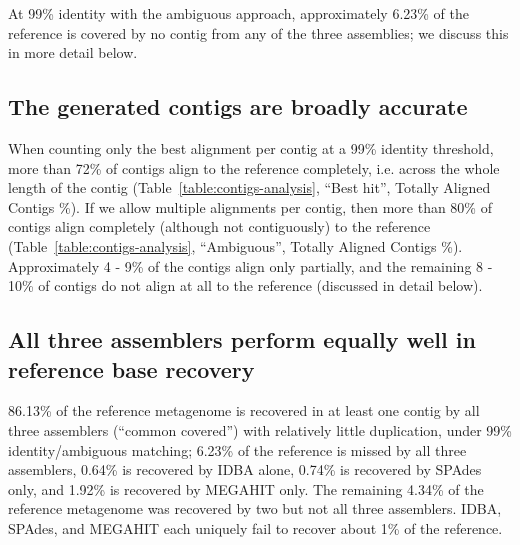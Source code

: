 \documentclass[10pt,a4paper,twocolumn]{article}
\begin{document}
At 99\% identity with the ambiguous approach, approximately 6.23\% of
the reference is covered by no contig from any of the three
assemblies; we discuss this in more detail below.

\subsection*{The generated contigs are broadly accurate} 

When counting only the best alignment per contig at a 99\%
identity threshold, more than 72\% of contigs align to the reference
completely, i.e. across the whole length of the contig (Table~\ref{table:contigs-analysis}, ``Best hit'', Totally Aligned Contigs \%).  If we allow
multiple alignments per contig, then more than 80\% of contigs align
completely (although not contiguously) to the reference (Table~\ref{table:contigs-analysis}, ``Ambiguous'', Totally Aligned Contigs \%).
Approximately 4 - 9\% of the contigs align only partially, and the
remaining 8 - 10\% of contigs do not align at all to the reference
(discussed in detail below).

\subsection*{All three assemblers perform equally well in reference base recovery}


86.13\% of the reference metagenome is recovered in at least one
contig by all three assemblers (``common covered'') with relatively
little duplication, under 99\% identity/ambiguous matching; 6.23\% of
the reference is missed by all three assemblers, 0.64\% is recovered
by IDBA alone, 0.74\% is recovered by SPAdes only, and 1.92\% is
recovered by MEGAHIT only.  The remaining 4.34\% of the reference
metagenome was recovered by two but not all three assemblers.
IDBA, SPAdes, and MEGAHIT each uniquely fail to recover about
1\% of the reference.
\end{document}
